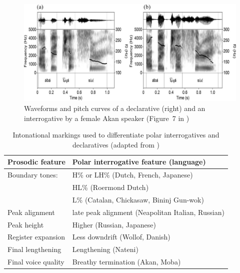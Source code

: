 \begin{figure}[H]
\begin{center}
\includegraphics[width = 1\textwidth]{figures/akan.jpg}
	\caption{Waveforms and pitch curves of a declarative (right) and an interrogative by a female Akan speaker (Figure~7 in \textcite{genzel2020akan}) }\label{fig:akan}
\end{center}
\end{figure}

 



\begin{table}[H]
\begin{center}
\begin{tabular}{l|l}
\hline
Prosodic feature & Polar interrogative feature (language)\\
\hline \hline
Boundary tones: & H\% or LH\% (Dutch, French, Japanese) \\
 & HL\% (Roermond Dutch) \\
 & L\% (Catalan, Chickasaw, Bininj Gun-wok) \\
 \hline
Peak alignment & late peak alignment (Neapolitan Italian, Russian) \\
\hline
Peak height & Higher (Russian, Japanese) \\
\hline
Register expansion & Less downdrift (Wollof, Danish) \\
\hline
Final lengthening & Lengthening (Nateni) \\
\hline
Final voice quality & Breathy termination (Akan, Moba)\\
\hline
\end{tabular}
\end{center}
\label{tab:prosody:typology}
\caption{Intonational markings used to differentiate polar interrogatives and declaratives (adapted from \cite{butler2012typology})}

\end{table}%



